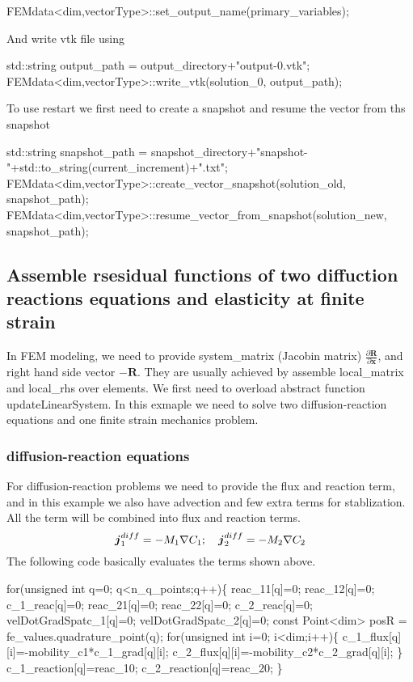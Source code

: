 \begin{DoxyCode}
FEMdata<dim,vectorType>::set_output_name(primary\_variables);
\end{DoxyCode}
 And write vtk file using 
\begin{DoxyCode}
std::string output\_path = output\_directory+\textcolor{stringliteral}{"output-0.vtk"};
FEMdata<dim,vectorType>::write_vtk(solution\_0, output\_path);
\end{DoxyCode}
 To use restart we first need to create a snapshot and resume the vector from ths snapshot 
\begin{DoxyCode}
std::string snapshot\_path = snapshot\_directory+\textcolor{stringliteral}{"snapshot-"}+std::to\_string(current\_increment)+\textcolor{stringliteral}{".txt"};
FEMdata<dim,vectorType>::create_vector_snapshot(solution\_old, snapshot\_path);
FEMdata<dim,vectorType>::resume_vector_from_snapshot(solution\_new, snapshot\_path);
\end{DoxyCode}
 \hypertarget{_intercalation_assemble}{}\subsection{Assemble rsesidual functions of two diffuction reactions equations and elasticity at finite strain}\label{_intercalation_assemble}
In F\+EM modeling, we need to provide system\+\_\+matrix (Jacobin matrix) $\frac{\partial \boldsymbol{R}}{\partial \boldsymbol{x}} $, and right hand side vector $-\boldsymbol{R}$. They are usually achieved by assemble {\ttfamily local\+\_\+matrix} and {\ttfamily local\+\_\+rhs} over elements. We first need to overload abstract function {\ttfamily update\+Linear\+System}. In this exmaple we need to solve two diffusion-\/reaction equations and one finite strain mechanics problem. \hypertarget{_intercalation_DRq}{}\subsubsection{diffusion-\/reaction equations}\label{_intercalation_DRq}
For diffusion-\/reaction problems we need to provide the flux and reaction term, and in this example we also have advection and few extra terms for stablization. All the term will be combined into {\ttfamily flux} and {\ttfamily reaction} terms. \[ \boldsymbol{j}_1^{diff}=-M_1\nabla C_\text{1}; \quad \boldsymbol{j}_2^{diff}=-M_2\nabla C_\text{2}\\ \] The following code basically evaluates the terms shown above. 
\begin{DoxyCode}
\textcolor{keywordflow}{for}(\textcolor{keywordtype}{unsigned} \textcolor{keywordtype}{int} q=0; q<n\_q\_points;q++)\{
    reac\_11[q]=0; reac\_12[q]=0; c\_1\_reac[q]=0; 
    reac\_21[q]=0; reac\_22[q]=0; c\_2\_reac[q]=0; 
    velDotGradSpatc\_1[q]=0;
    velDotGradSpatc\_2[q]=0;
    \textcolor{keyword}{const} Point<dim> posR = fe\_values.quadrature\_point(q);
    \textcolor{keywordflow}{for}(\textcolor{keywordtype}{unsigned} \textcolor{keywordtype}{int} i=0; i<dim;i++)\{
        c\_1\_flux[q][i]=-mobility\_c1*c\_1\_grad[q][i];
        c\_2\_flux[q][i]=-mobility\_c2*c\_2\_grad[q][i];
    \}       
    c\_1\_reaction[q]=reac\_10;
    c\_2\_reaction[q]=reac\_20;
\}
\end{DoxyCode}
